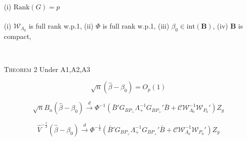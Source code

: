 \documentclass{beamer}
\begin{document}
    \begin{frame}
    \\
(i)   $\textrm{Rank}(G)=p$ \\
\vspace{10pt}
 \\

(i) $\mathcal{W}_{\Lambda_0}$ is full rank w.p.1, (ii) $\Phi$ is full rank w.p.1, (iii) $\beta_0 \in\textrm{int}( \mathbf{B})$, (iv) $\mathbf{B}$ is compact,


\ \begin{center} \textsc{Theorem 2}  Under A1,A2,A3\end{center}
  \begin{equation*} \label{consistency} \sqrt{n}(\hat{\beta}- \beta_0)= O_p(1) \end{equation*}

  \begin{equation*}  \label{limit} \sqrt{n}B_n(\hat{\beta}- \beta_0)\overset{d}{\rightarrow} \Phi^{-1} \left(\bar{B}'G_{BP_+}\Lambda_+^{-1}G_{BP_+}'\bar{B}+
  \mathcal{C}\mathcal{W}_{\Lambda_0}^{-1}\mathcal{W}_{P_0}'\right) Z_g\end{equation*}

  \begin{equation*}  \label{limit}\hat{V}^{-\frac{1}{2}}(\hat{\beta}- \beta_0)\overset{d}{\rightarrow}\Phi^{-\frac{1}{2}} \left(\bar{B}'G_{BP_+}\Lambda_+^{-1}G_{BP_+}'\bar{B}+
  \mathcal{C}\mathcal{W}_{\Lambda_0}^{-1}\mathcal{W}_{P_0}'\right) Z_g\end{equation*}

    \end{frame}
\end{document}
